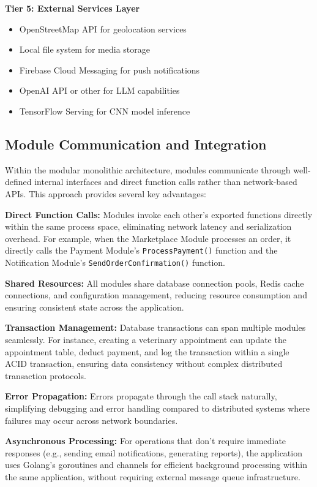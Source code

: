 \textbf{Tier 5: External Services Layer}
\begin{itemize}
    \item OpenStreetMap API for geolocation services
    \item Local file system for media storage
    \item Firebase Cloud Messaging for push notifications
    \item OpenAI API or other for LLM capabilities
    \item TensorFlow Serving for CNN model inference
\end{itemize}

\subsection{Module Communication and Integration}

Within the modular monolithic architecture, modules communicate through well-defined internal interfaces and direct function calls rather than network-based APIs. This approach provides several key advantages:

\textbf{Direct Function Calls:} Modules invoke each other's exported functions directly within the same process space, eliminating network latency and serialization overhead. For example, when the Marketplace Module processes an order, it directly calls the Payment Module's \texttt{ProcessPayment()} function and the Notification Module's \texttt{SendOrderConfirmation()} function.

\textbf{Shared Resources:} All modules share database connection pools, Redis cache connections, and configuration management, reducing resource consumption and ensuring consistent state across the application.

\textbf{Transaction Management:} Database transactions can span multiple modules seamlessly. For instance, creating a veterinary appointment can update the appointment table, deduct payment, and log the transaction within a single ACID transaction, ensuring data consistency without complex distributed transaction protocols.

\textbf{Error Propagation:} Errors propagate through the call stack naturally, simplifying debugging and error handling compared to distributed systems where failures may occur across network boundaries.

\textbf{Asynchronous Processing:} For operations that don't require immediate responses (e.g., sending email notifications, generating reports), the application uses Golang's goroutines and channels for efficient background processing within the same application, without requiring external message queue infrastructure.

